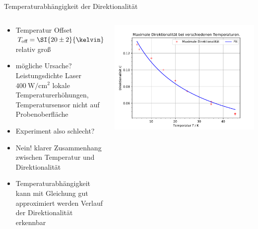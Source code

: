 \begin{frame}{Temperaturabhängigkeit der Direktionalität}
    \begin{columns}
        \begin{column}{0.5\textwidth}
            \begin{itemize} 
                \item <1-> Temperatur Offset $T_\text{off}  = \SI{ 20 \pm 2}{\kelvin}$ relativ groß
                \bigskip
                \item <2-> mögliche Ursache?\\ Leistungsdichte Laser $\SI{400}{\watt\per\centi\meter^2}$
                \rightarrow lokale Temperaturerhöhungen,\\ Temperatursensor nicht auf Probenoberfläche 
                \item <3-> Experiment also schlecht? 
                \bigskip
                \item <4-> Nein! \rightarrow klarer Zusammenhang zwischen Temperatur und Direktionalität
                \bigskip
                \item <5-> Temperaturabhängigkeit kann mit Gleichung gut approximiert werden \rightarrow 
                Verlauf der Direktionalität erkennbar 
            \end{itemize}
        \end{column}
        \begin{column}{0.5\textwidth}
            \centering
             {%
            \includegraphics[scale=0.4]{images/Maximale_Rho_bei_Temperaturabhänigkeit.pdf}\\[-0.5\baselineskip]%
            }%
        \end{column}
    \end{columns}
\end{frame}

